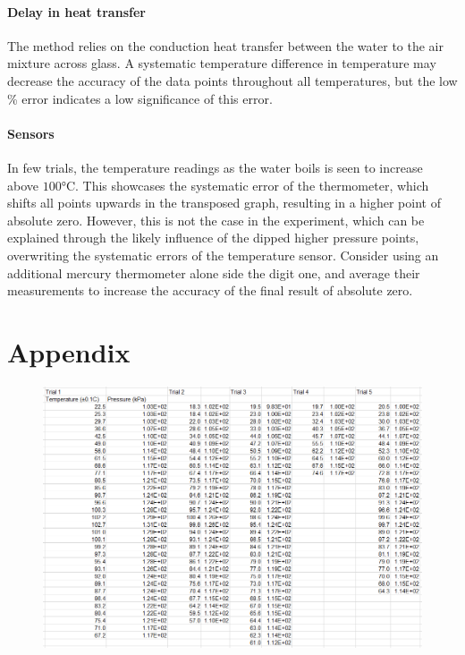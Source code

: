 \documentclass[a4paper,12pt]{article}
\begin{document}
\paragraph{Delay in heat transfer}
The method relies on the conduction heat transfer between the water to the air mixture across glass. A systematic temperature difference in temperature may decrease the accuracy of the data points throughout all temperatures, but the low \% error indicates a low significance of this error.

\paragraph{Sensors}
In few trials, the temperature readings as the water boils is seen to increase above $100\si{\celsius}$. This showcases the systematic error of the thermometer, which shifts all points upwards in the transposed graph, resulting in a higher point of absolute zero. However, this is not the case in the experiment, which can be explained through the likely influence of the dipped higher pressure points, overwriting the systematic errors of the temperature sensor. Consider using an additional mercury thermometer alone side the digit one, and average their measurements to increase the accuracy of the final result of absolute zero.

\nocite{*}
\printbibliography


\newpage
\section*{Appendix}
\appendix
\begin{figure}[H]
    \centering
    \includegraphics[scale=0.55]{assets/unitdata.png}
    \label{fig:pq}
\end{figure}
\end{document}
